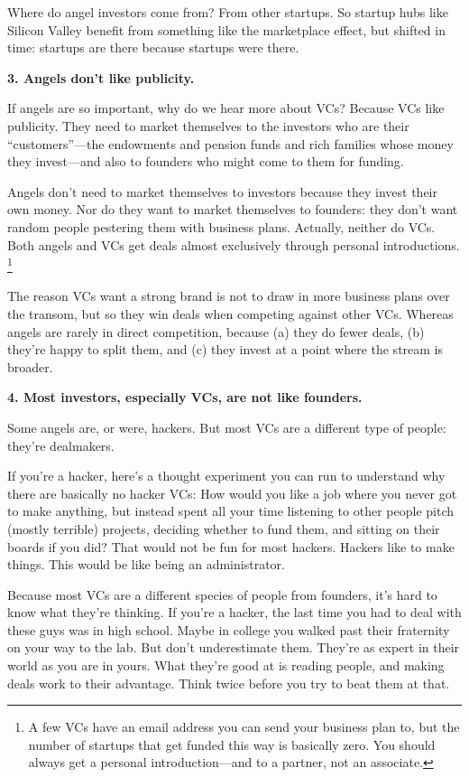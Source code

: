 \documentclass[12pt]{book}
\begin{document}
Where do angel investors come from? From other startups. So startup hubs
like Silicon Valley benefit from something like the marketplace effect,
but shifted in time: startups are there because startups were there.

\textbf{3. Angels don't like publicity.}

If angels are so important, why do we hear more about VCs? Because VCs
like publicity. They need to market themselves to the investors who are
their ``customers''---the endowments and pension funds and rich families
whose money they invest---and also to founders who might come to them
for funding.

Angels don't need to market themselves to investors because they invest
their own money. Nor do they want to market themselves to founders: they
don't want random people pestering them with business plans. Actually,
neither do VCs. Both angels and VCs get deals almost exclusively through
personal introductions. \footnote{A few VCs have an email address you can send your business plan
to, but the number of startups that get funded this way is basically
zero. You should always get a personal introduction---and to a partner,
not an associate.}

The reason VCs want a strong brand is not to draw in more business plans
over the transom, but so they win deals when competing against other
VCs. Whereas angels are rarely in direct competition, because (a) they
do fewer deals, (b) they're happy to split them, and (c) they invest at
a point where the stream is broader.

\textbf{4. Most investors, especially VCs, are not like founders.}

Some angels are, or were, hackers. But most VCs are a different type of
people: they're dealmakers.

If you're a hacker, here's a thought experiment you can run to
understand why there are basically no hacker VCs: How would you like a
job where you never got to make anything, but instead spent all your
time listening to other people pitch (mostly terrible) projects,
deciding whether to fund them, and sitting on their boards if you did?
That would not be fun for most hackers. Hackers like to make things.
This would be like being an administrator.

Because most VCs are a different species of people from founders, it's
hard to know what they're thinking. If you're a hacker, the last time
you had to deal with these guys was in high school. Maybe in college you
walked past their fraternity on your way to the lab. But don't
underestimate them. They're as expert in their world as you are in
yours. What they're good at is reading people, and making deals work to
their advantage. Think twice before you try to beat them at that.
\end{document}
